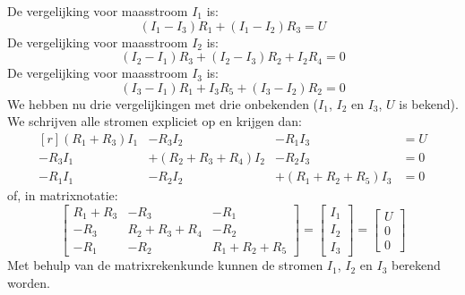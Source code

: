 De vergelijking voor maasstroom $I_1$ is:
%
\begin{equation}
(I_1 - I_3)R_1 + (I_1-I_2)R_3 = U
\end{equation}
%
De vergelijking voor maasstroom $I_2$ is:
%
\begin{equation}
(I_2-I_1)R_3 + (I_2-I_3)R_2 + I_2R_4=0
\end{equation}
%
De vergelijking voor maasstroom $I_3$ is:
%
\begin{equation}
(I_3-I_1)R_1 + I_3R_5 + (I_3-I_2)R_2 = 0
\end{equation}
%
We hebben nu drie vergelijkingen met drie onbekenden ($I_1$, $I_2$ en $I_3$, $U$ is bekend). We schrijven alle stromen expliciet op en krijgen dan:
%
\begin{equation}
\begin{matrix*}[r]
(R_1+R_3)I_1 & -R_3I_2 & -R_1I_3 &= U \\
-R_3I_1 & +(R_2+R_3+R_4)I_2 & -R_2I_3 &= 0\\
-R_1I_1 & -R_2I_2 & +(R_1+R_2+R_5)I_3 &=0
\end{matrix*}
\end{equation}
%
of, in matrixnotatie:
%
\begin{equation}
\begin{bmatrix}
R_1+R_3 & -R_3 & -R_1 \\
-R_3 & R_2+R_3+R_4 & -R_2 \\
-R_1 & -R_2 & R_1+R_2+R_5
\end{bmatrix} = 
\begin{bmatrix}
I_1 \\ I_2 \\ I_3
\end{bmatrix} =
\begin{bmatrix}
U \\ 0 \\ 0
\end{bmatrix}
\end{equation}
%
Met behulp van de matrixrekenkunde kunnen de stromen $I_1$, $I_2$ en $I_3$ berekend worden.


